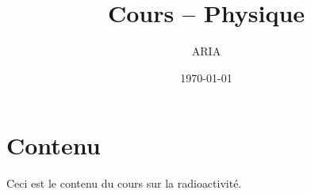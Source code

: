 \documentclass[11pt,a4paper]{article}
\title{Cours – Physique}
\author{ARIA}
\date{\today}
\begin{document}
            \nonstopmode
            \maketitle
            \tableofcontents
            \newpage
            \section*{Contenu}
            Ceci est le contenu du cours sur la radioactivité.
            
\end{document}
